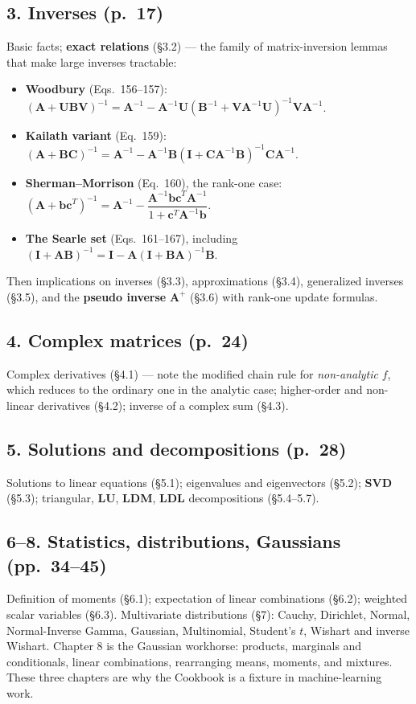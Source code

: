 \documentclass[10pt,a4paper]{article}
\begin{document}
\subsection{3. Inverses (p.~17)}
Basic facts; \textbf{exact relations} (\S3.2) --- the family of matrix-inversion
lemmas that make large inverses tractable:
\begin{itemize}
\item \textbf{Woodbury} (Eqs.~156--157):
      $(\mathbf{A}+\mathbf{UBV})^{-1}=\mathbf{A}^{-1}-\mathbf{A}^{-1}\mathbf{U}(\mathbf{B}^{-1}+\mathbf{VA}^{-1}\mathbf{U})^{-1}\mathbf{VA}^{-1}$.
\item \textbf{Kailath variant} (Eq.~159):
      $(\mathbf{A}+\mathbf{BC})^{-1}=\mathbf{A}^{-1}-\mathbf{A}^{-1}\mathbf{B}(\mathbf{I}+\mathbf{CA}^{-1}\mathbf{B})^{-1}\mathbf{CA}^{-1}$.
\item \textbf{Sherman--Morrison} (Eq.~160), the rank-one case:
      $(\mathbf{A}+\mathbf{bc}^{T})^{-1}=\mathbf{A}^{-1}-\dfrac{\mathbf{A}^{-1}\mathbf{bc}^{T}\mathbf{A}^{-1}}{1+\mathbf{c}^{T}\mathbf{A}^{-1}\mathbf{b}}$.
\item \textbf{The Searle set} (Eqs.~161--167), including
      $(\mathbf{I}+\mathbf{AB})^{-1}=\mathbf{I}-\mathbf{A}(\mathbf{I}+\mathbf{BA})^{-1}\mathbf{B}$.
\end{itemize}
Then implications on inverses (\S3.3), approximations (\S3.4), generalized inverses
(\S3.5), and the \textbf{pseudo inverse} $\mathbf{A}^{+}$ (\S3.6) with rank-one
update formulas.

\subsection{4. Complex matrices (p.~24)}
Complex derivatives (\S4.1) --- note the modified chain rule for \emph{non-analytic}
$f$, which reduces to the ordinary one in the analytic case; higher-order and
non-linear derivatives (\S4.2); inverse of a complex sum (\S4.3).

\subsection{5. Solutions and decompositions (p.~28)}
Solutions to linear equations (\S5.1); eigenvalues and eigenvectors (\S5.2);
\textbf{SVD} (\S5.3); triangular, \textbf{LU}, \textbf{LDM}, \textbf{LDL}
decompositions (\S5.4--5.7).

\subsection{6--8. Statistics, distributions, Gaussians (pp.~34--45)}
Definition of moments (\S6.1); expectation of linear combinations (\S6.2); weighted
scalar variables (\S6.3).  Multivariate distributions (\S7): Cauchy, Dirichlet,
Normal, Normal-Inverse Gamma, Gaussian, Multinomial, Student's $t$, Wishart and
inverse Wishart.  Chapter 8 is the Gaussian workhorse: products, marginals and
conditionals, linear combinations, rearranging means, moments, and mixtures.  These
three chapters are why the Cookbook is a fixture in machine-learning work.
\end{document}
